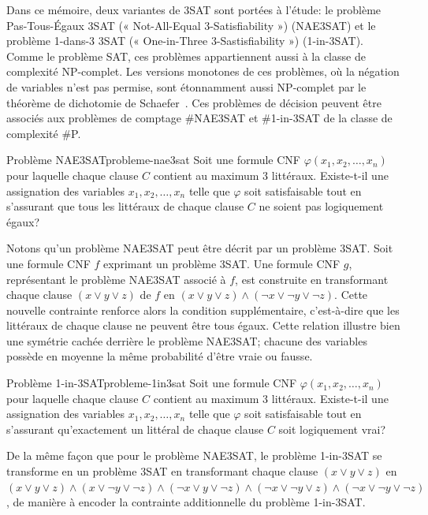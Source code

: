 Dans ce mémoire, deux variantes de 3SAT sont portées à l'étude: le problème Pas-Tous-Égaux 3SAT (« Not-All-Equal 3-Satisfiability ») (NAE3SAT) et le problème 1-dans-3 3SAT (« One-in-Three 3-Sastisfiability ») (1-in-3SAT). 
Comme le problème SAT, ces problèmes appartiennent aussi à la classe de complexité \textsf{NP}-complet. Les versions monotones de ces problèmes, où la négation de variables n'est pas permise, sont étonnamment aussi \textsf{NP}-complet par le théorème de dichotomie de Schaefer~\cite{schaeferComplexitySatisfiabilityProblems1978}. Ces problèmes de décision peuvent être associés aux problèmes de comptage \#NAE3SAT et \#1-in-3SAT de la classe de complexité \textsf{\#P}.

\begin{maindefinition}{Problème NAE3SAT}{probleme-nae3sat}
    Soit une formule CNF $\varphi(x_{1}, x_{2}, \dots, x_{n})$ pour laquelle chaque clause $C$ contient au maximum 3 littéraux. Existe-t-il une assignation des variables $x_{1}, x_{2}, \dots, x_{n}$ telle que $\varphi$ soit satisfaisable tout en s'assurant que tous les littéraux de chaque clause $C$ ne soient pas logiquement égaux?
\end{maindefinition}

Notons qu'un problème NAE3SAT peut être décrit par un problème 3SAT. Soit une formule CNF $f$ exprimant un problème 3SAT. Une formule CNF $g$, représentant le problème NAE3SAT associé à $f$, est construite en transformant chaque clause $(x \lor y \lor z)$ de $f$ en $(x \lor y \lor z) \land (\neg x \lor \neg y \lor \neg z)$. Cette nouvelle contrainte renforce alors la condition supplémentaire, c'est-à-dire que les littéraux de chaque clause ne peuvent être tous égaux. Cette relation illustre bien une symétrie cachée derrière le problème NAE3SAT; chacune des variables possède en moyenne la même probabilité d'être vraie ou fausse.

\begin{maindefinition}{Problème 1-in-3SAT}{probleme-1in3sat}
    Soit une formule CNF $\varphi(x_{1}, x_{2}, \dots, x_{n})$ pour laquelle chaque clause $C$ contient au maximum 3 littéraux. Existe-t-il une assignation des variables $x_{1}, x_{2}, \dots, x_{n}$ telle que $\varphi$ soit satisfaisable tout en s'assurant qu'exactement un littéral de chaque clause $C$ soit logiquement vrai?
\end{maindefinition}

De la même façon que pour le problème NAE3SAT, le problème 1-in-3SAT se transforme en un problème 3SAT en transformant chaque clause $(x \lor y \lor z)$ en $(x \lor y \lor z) \land (x \lor \neg y \lor \neg z) \land (\neg x \lor y \lor \neg z) \land (\neg x \lor \neg y \lor z) \land (\neg x \lor \neg y \lor \neg z)$, de manière à encoder la contrainte additionnelle du problème 1-in-3SAT.

